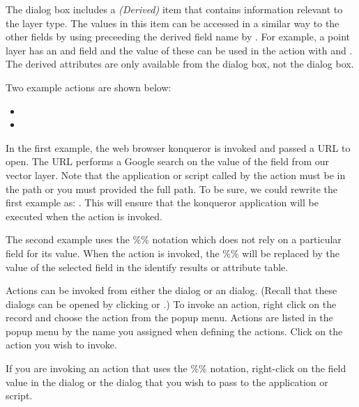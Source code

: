 The  dialog box includes a {\em (Derived)} item that
contains information relevant to the layer type. The
values in this item can be accessed in a similar way to the other fields
by using preceeding the derived field name by . For
example, a point layer has an  and  field and the
value of these can be used in the action with  and
. The derived attributes are only available from the
 dialog box, not the  dialog box.

Two example actions are shown below:

\begin{itemize}
  \item {}
  \item {}
\end{itemize}

In the first example, the web browser konqueror is invoked and passed a URL to
open. The URL performs a Google search on the value of the  field
from our vector layer. Note that the application or script called by the
action must be in the path or you must provided the full path. To be sure, we could
rewrite the first example as: . This will ensure that the konqueror
application will be executed when the action is invoked.

The second example uses the \%\% notation which does not rely on a particular
field for its value. When the action is invoked, the \%\% will be replaced by
the value of the selected field in the identify results or attribute table.

\label{label_usingactions}
Actions can be invoked from either the  dialog or an
  dialog. 
(Recall that these dialogs can be opened by clicking
or
.)
To invoke an action, 
right click on the
record and choose the action from the popup menu. Actions are listed in the popup
menu by the name you assigned when defining the actions. Click on the action you
wish to invoke.

If you are invoking an action that uses the \%\% notation, right-click on the
field value in the  dialog or the
 dialog that you wish to pass to the application or script.

